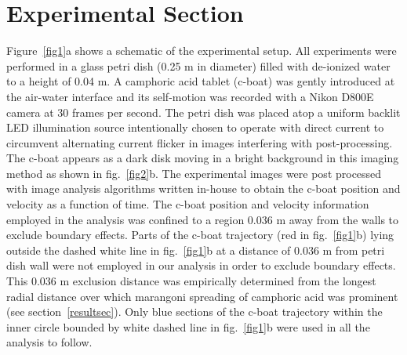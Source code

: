 \documentclass[journal=langd5, manuscript=article, layout=twocolumn]{achemso}
\begin{document}
\section{Experimental Section}
\label{expsec}
Figure~\ref{fig1}a shows a schematic of the experimental setup. All experiments were performed in a glass petri dish (0.25 m in diameter) filled with de-ionized water to a height of 0.04 m. A camphoric acid tablet (c-boat) was gently introduced at the air-water interface and its self-motion was recorded with a Nikon D800E camera at 30 frames per second. The petri dish was placed atop a uniform backlit LED illumination source intentionally chosen to operate with direct current to circumvent alternating current flicker in images interfering with post-processing.  The c-boat appears as a dark disk moving in a bright background in this imaging method as shown in fig.~\ref{fig2}b. The experimental images were post processed with image analysis algorithms written in-house to obtain the c-boat position and velocity as a function of time. The c-boat position and velocity information employed in the analysis was confined to a region 0.036 m away from the walls to exclude boundary effects. Parts of the c-boat trajectory (red in fig.~\ref{fig1}b) lying outside the dashed white line in fig.~\ref{fig1}b at a distance of 0.036 m from petri dish wall were not employed in our analysis in order to exclude boundary effects. This 0.036 m exclusion distance was empirically determined from the longest radial distance over which marangoni spreading of camphoric acid was prominent (see section~\ref{resultsec}). Only blue sections of the c-boat trajectory within the inner circle bounded by white dashed line in fig.~\ref{fig1}b were used in all the analysis to follow.
\end{document}
